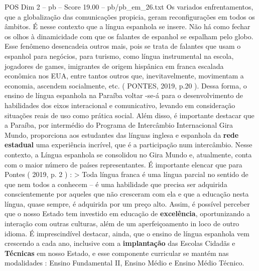 \begin{textsample}{POS Dim 2 – pb – Score 19.00 – pb/pb\_em\_26.txt}
Os variados enfrentamentos, que a globalização das comunicações propicia, geram reconfigurações em todos os âmbitos.
É nesse contexto que a língua espanhola se insere.
Não há como fechar os olhos à dinamicidade com que os falantes de espanhol se espalham pelo globo.
Esse fenômeno desencadeia outros mais, pois se trata de falantes que usam o espanhol para negócios, para turismo, como língua instrumental na escola, jogadores de games, imigrantes de origem hispânica em franca escalada econômica nos EUA, entre tantos outros que, inevitavelmente, movimentam a economia, ascendem socialmente, etc. ( PONTES, 2019, p.20 ).
Dessa forma, o ensino de língua espanhola na Paraíba voltar -se-á para o desenvolvimento de habilidades dos eixos interacional e comunicativo, levando em consideração situações reais de uso como prática social.
Além disso, é importante destacar que a Paraíba, por intermédio do Programa de Intercâmbio Internacional Gira Mundo, proporciona aos estudantes das línguas inglesa e espanhola da \textbf{rede} \textbf{estadual} uma experiência incrível, que é a participação num intercâmbio.
Nesse contexto, a Língua espanhola se consolidou no Gira Mundo e, atualmente, conta com o maior número de países representantes.
É importante elencar que para Pontes ( 2019, p. 2 ) : > Toda língua franca é uma língua parcial no sentido de que nem todos a conhecem – é uma habilidade que precisa ser adquirida conscientemente por aqueles que não cresceram com ela e que a educação nesta língua, quase sempre, é adquirida por um preço alto.
Assim, é possível perceber que o nosso Estado tem investido em educação de \textbf{excelência}, oportunizando a interação com outras culturas, além de um aperfeiçoamento in loco de outro idioma.
É imprescindível destacar, ainda, que o ensino de língua espanhola vem crescendo a cada ano, inclusive com a \textbf{implantação} das Escolas Cidadãs e \textbf{Técnicas} em nosso Estado, e esse componente curricular se mantém nas modalidades : Ensino Fundamental II, Ensino Médio e Ensino Médio Técnico.

\end{textsample}
